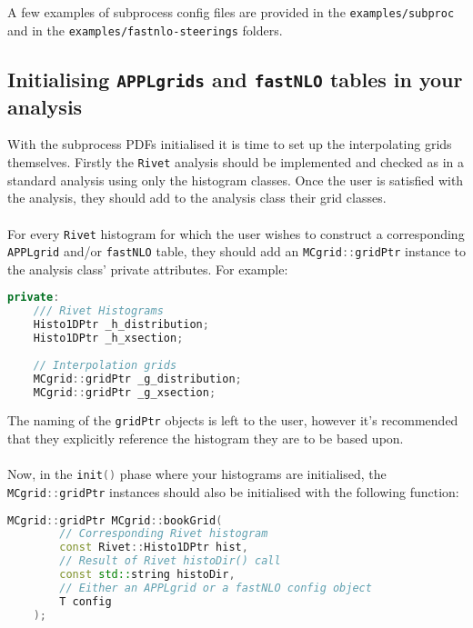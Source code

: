 \documentclass[11pt]{article}
\newcommand{\rivet} {{\tt Rivet}\xspace}
\newcommand{\appl} {{\tt APPLgrid}\xspace}
\newcommand{\fnlo} {{\tt fastNLO}\xspace}
\begin{document}
A few examples of subprocess config files are provided in the \lstinline[language=bash]{examples/subproc} and in the \lstinline[language=bash]{examples/fastnlo-steerings} folders.

\subsection{Initialising {\tt APPLgrids} and \fnlo tables in your analysis}
With the subprocess PDFs initialised it is time to set up the interpolating grids themselves. Firstly the \rivet analysis should be implemented and checked as in a standard analysis using only the histogram classes. Once the user is satisfied with the analysis, they should add to the analysis class
their grid classes. \\\\
For every \rivet histogram for which the user wishes to construct a corresponding \appl and/or \fnlo table, they should add an \lstinline[language=c++]{MCgrid::gridPtr} instance to the analysis class' private attributes. For example:
\begin{lstlisting}[language=c++]
 private:
    /// Rivet Histograms
    Histo1DPtr _h_distribution;
    Histo1DPtr _h_xsection;
    
    // Interpolation grids
    MCgrid::gridPtr _g_distribution;
    MCgrid::gridPtr _g_xsection;
\end{lstlisting}
 The naming of the \lstinline[language=c++]{gridPtr} objects is left to the user, however it's recommended that they explicitly reference the histogram they are to be based upon.\\\\
 Now, in the \lstinline[language=c++]{init()} phase where your histograms are initialised, the \lstinline[language=c++]{MCgrid::gridPtr} instances should also be initialised with the following function:
 
\begin{lstlisting}[language=c++]
	MCgrid::gridPtr MCgrid::bookGrid( 
		// Corresponding Rivet histogram
		const Rivet::Histo1DPtr hist,      
		// Result of Rivet histoDir() call
		const std::string histoDir,
		// Either an APPLgrid or a fastNLO config object
		T config
	);   
\end{lstlisting}
\end{document}
